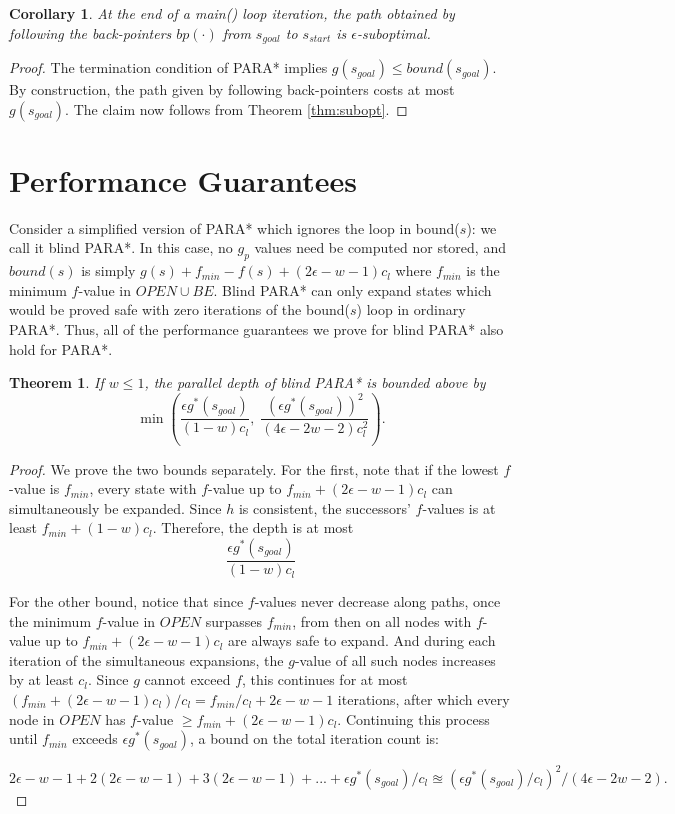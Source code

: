 \documentclass[letterpaper]{article}
\newtheorem{thm}{Theorem}
\newtheorem{cor}{Corollary}
\begin{document}
\begin{cor}
\label{cor:subopt}
At the end of a main() loop iteration, the path obtained by following the back-pointers $bp(\cdot)$ from $s_{goal}$ to $s_{start}$ is $\epsilon$-suboptimal.
\end{cor}

\begin{proof}
The termination condition of PARA* implies $g(s_{goal}) \le bound(s_{goal})$. By construction, the path given by following back-pointers costs at most $g(s_{goal})$. The claim now follows from Theorem \ref{thm:subopt}.
\end{proof}

\section{Performance Guarantees}

Consider a simplified version of PARA* which ignores the loop in bound($s$): we call it blind PARA*. In this case, no $g_p$ values need be computed nor stored, and $bound(s)$ is simply $g(s) + f_{min} - f(s) + (2\epsilon-w-1)c_l$ where $f_{min}$ is the minimum $f$-value in $OPEN \cup BE$. Blind PARA* can only expand states which would be proved safe with zero iterations of the bound($s$) loop in ordinary PARA*. Thus, all of the performance guarantees we prove for blind PARA* also hold for PARA*. 

\begin{thm}
\label{thm:depth}
If $w \le 1$, the parallel depth of blind PARA* is bounded above by
\[\min\left(\frac{\epsilon g^*(s_{goal})}{(1-w)c_l},\;
\frac{\left(\epsilon g^*(s_{goal})\right)^2 }{(4\epsilon-2w-2)c_l^2}\right).\]
\end{thm}

\begin{proof}
We prove the two bounds separately. For the first, note that if the lowest $f$-value is $f_{min}$, every state with $f$-value up to $f_{min} + (2\epsilon-w-1)c_l$ can simultaneously be expanded. Since $h$ is consistent, the successors' $f$-values is at least $f_{min} + (1-w)c_l$. Therefore, the depth is at most
\[\frac{\epsilon g^*(s_{goal})}{(1-w)c_l}\]

For the other bound, notice that since $f$-values never decrease along paths, once the minimum $f$-value in $OPEN$ surpasses $f_{min}$, from then on all nodes with $f$-value up to $f_{min} + (2\epsilon-w-1)c_l$ are always safe to expand. And during each iteration of the simultaneous expansions, the $g$-value of all such nodes increases by at least $c_l$. Since $g$ cannot exceed $f$, this continues for at most $(f_{min} + (2\epsilon-w-1)c_l) / c_l = f_{min}/c_l + 2\epsilon-w-1$ iterations, after which every node in $OPEN$ has $f$-value $\ge f_{min} + (2\epsilon-w-1)c_l$. Continuing this process until $f_{min}$ exceeds $\epsilon g^*(s_{goal})$, a bound on the total iteration count is:

$2\epsilon-w-1 + 2(2\epsilon-w-1) + 3(2\epsilon-w-1) + ... + \epsilon g^*(s_{goal})/c_l
\approxeq (\epsilon g^*(s_{goal})/c_l )^2 / ( 4\epsilon-2w-2 ).$
\end{proof}
\end{document}

